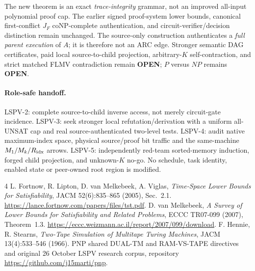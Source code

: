\documentclass[11pt]{article}
\begin{document}
The new theorem is an exact \emph{trace-integrity} grammar, not an improved all-input polynomial proof cap. The earlier signed proof-system lower bounds, canonical first-conflict $J_F$ coNP-complete authentication, and circuit-verifier/decision distinction remain unchanged. The source-only construction authenticates a \emph{full parent execution} of $A$; it is therefore not an ARC edge. Stronger semantic DAG certificates, paid local source-to-child projection, arbitrary-$K$ self-contraction, and strict matched FLMV contradiction remain \textbf{OPEN}; $P$ versus $NP$ remains \textbf{OPEN}.

\paragraph{Role-safe handoff.} LSPV-2: complete source-to-child inverse access, not merely circuit-gate incidence. LSPV-3: seek stronger local refutation/derivation with a uniform all-UNSAT cap and real source-authenticated two-level tests. LSPV-4: audit native maximum-index space, physical source/proof bit traffic and the same-machine $M_1/M_k/R_{\rm idx}$ arrows. LSPV-5: independently red-team sorted-memory induction, forged child projection, and unknown-$K$ no-go. No schedule, task identity, enabled state or peer-owned root region is modified.

\begin{thebibliography}{4}
 L. Fortnow, R. Lipton, D. van Melkebeek, A. Viglas, \emph{Time-Space Lower Bounds for Satisfiability}, JACM 52(6):835--865 (2005), Sec.~2.1. \url{https://lance.fortnow.com/papers/files/tst.pdf}.
 D. van Melkebeek, \emph{A Survey of Lower Bounds for Satisfiability and Related Problems}, ECCC TR07-099 (2007), Theorem~1.3. \url{https://eccc.weizmann.ac.il/report/2007/099/download}.
 F. Hennie, R. Stearns, \emph{Two-Tape Simulation of Multitape Turing Machines}, JACM 13(4):533--546 (1966).
 PNP shared DUAL-TM and RAM-VS-TAPE directives and original 26 October LSPV research corpus, repository \url{https://github.com/j15marti/pnp}.
\end{thebibliography}
\end{document}
